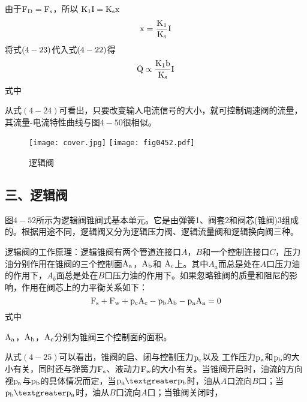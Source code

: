 由于$\rm F_D=F_s$，所以\hspace{2.2cm} $\rm K_1I=K_s x$
\begin{equation}
\rm x=\frac{K_1}{K_s}I
\end{equation}
将式$\rm (4-23)$代入式$\rm (4-22)$得
\begin{equation}
\rm Q\propto\frac{K_1 b}{K_s}I
\end{equation}
\noindent 式中 \quad
{}

从式$(4-24)$可看出，只要改变输人电流信号的大小，就可控制调速阀的流量，其流量-电流特性曲线与图$4- 50$很相似。

\begin{figure}[!hbt]
\centering
\ifOpenSource
\texttt{[image: cover.jpg]}
\else
\texttt{[image: fig0452.pdf]}
\fi
\caption{逻辑阀}
\label{fig:fig0452}
\end{figure}

\subsection{三、逻辑阀}

图$4-52$所示为逻辑阀锥阀式基本单元。它是由弹簧1、阀套2和阀芯(锥阀)3组成的。根据用途不同，逻辑阀又分为逻辑压力阀、逻辑流量阀和逻辑换向阀三种。


逻辑阀的工作原理：逻辑锥阀有两个管道连接口$A$，$B$和一个控制连接口$C$，压力油分别作用在锥阀的三个控制面$\rm A_a$，$\rm A_b$和
$\rm A_c$上。其中$A_a$而总是处在$A$口压力油的作用下，$A_b$面总是处在$B$口压力油的作用下。如果忽略锥阀的质量和阻尼的影响，作用在阀芯上的力平衡关系如下：
\begin{equation}
\rm F_s+F_w+p_cA_c-p_bA_b-p_aA_a=0
\end{equation}
\noindent 式中 \quad
{}

\noindent \quad $\rm A_a$，$\rm A_b$，$\rm A_c$分别为锥阀三个控制面的面积。

从式$(4- 25)$可以看出，锥阀的启、闭与控制压力$\rm p_c$以及
工作压力$\rm p_a$和$\rm p_b$的大小有关，同时还与弹簧力$\rm F_s$、液动力$\rm F_w$的大小有关。当锥阀开启时，油流的方向视$\rm p_a$与$\rm p_b$的具体情况而定，当$\rm p_a\textgreater p_b$时，油从$A$口流向$B$口；当$\rm p_b\textgreater p_a$时，油从$B$口流向$A$口；当锥阀关闭时，
